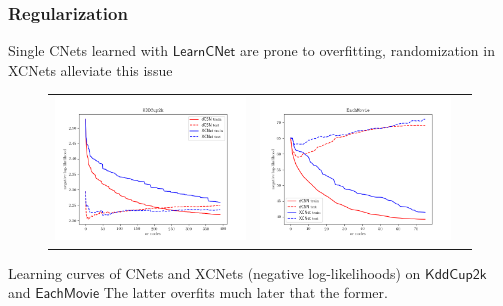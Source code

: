 \documentclass[xcolor={usenames,dvipsnames,svgnames}, compress]{beamer}
\begin{document}
\begin{frame}[t]
  \frametitle{Regularization}
  \small
  Single CNets learned with $\mathsf{LearnCNet}$ are prone to overfitting, randomization in
 \textsf{XCNets} alleviate this issue
    
\begin{figure}[t]
  \label{fig:ll}
  \centering
  \begin{tabular}{ccc}
    \includegraphics[width=0.48\linewidth]{figures/kdd} &
    \includegraphics[width=0.48\linewidth]{figures/tmovie}
  \end{tabular}
\end{figure}
\hspace{50pt}
\begin{minipage}{0.8\linewidth}
  \vspace{-10pt}
\scriptsize  Learning curves of CNets and XCNets (negative
log-likelihoods) on $\mathsf{KddCup2k}$ and $\mathsf{EachMovie}$
The latter overfits much later that the former.
\end{minipage}

\end{frame}
\end{document}
